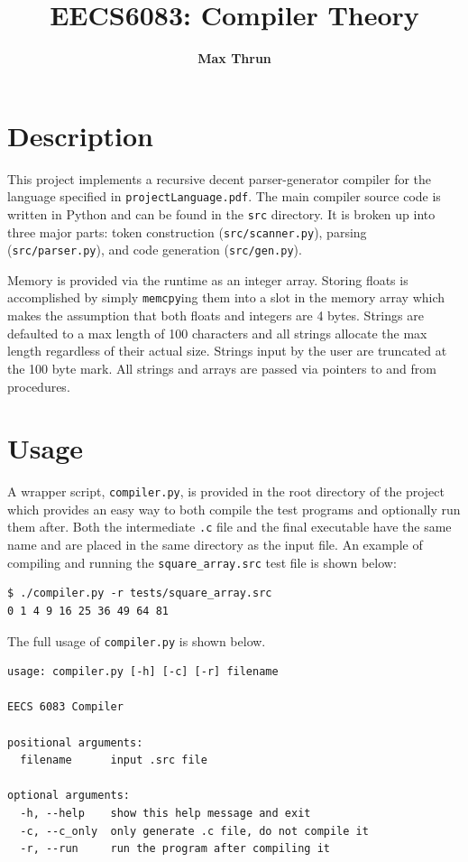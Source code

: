 \documentclass[10pt]{article}
\title{
    \vspace{2in}
    \textmd{\textbf{EECS6083: Compiler Theory}}\\
    \vspace{4in}
}
\author{\textbf{Max Thrun}}
\begin{document}
\maketitle
\newpage
\section{Description}
This project implements a recursive decent parser-generator compiler for the
language specified in \texttt{projectLanguage.pdf}. The main compiler
source code is written in Python and can be found in the \texttt{src}
directory.  It is broken up into three major parts: token construction
(\texttt{src/scanner.py}), parsing (\texttt{src/parser.py}), and code
generation (\texttt{src/gen.py}).

Memory is provided via the runtime as an integer array. Storing floats is
accomplished by simply \texttt{memcpy}ing them into a slot in the memory array
which makes the assumption that both floats and integers are 4 bytes.  Strings
are defaulted to a max length of 100 characters and all strings allocate the
max length regardless of their actual size. Strings input by the user are
truncated at the 100 byte mark. All strings and arrays are passed via pointers
to and from procedures.

\section{Usage}

A wrapper script, \texttt{compiler.py}, is provided in the root directory of
the project which provides an easy way to both compile the test programs and
optionally run them after. Both the intermediate \texttt{.c} file and the final
executable have the same name and are placed in the same directory as the input
file. An example of compiling and running the \texttt{square\_array.src} test
file is shown below:

\begin{verbatim}
$ ./compiler.py -r tests/square_array.src
0 1 4 9 16 25 36 49 64 81
\end{verbatim}

The full usage of \texttt{compiler.py} is shown below.

\begin{verbatim}
usage: compiler.py [-h] [-c] [-r] filename

EECS 6083 Compiler

positional arguments:
  filename      input .src file

optional arguments:
  -h, --help    show this help message and exit
  -c, --c_only  only generate .c file, do not compile it
  -r, --run     run the program after compiling it
\end{verbatim}
\end{document}
